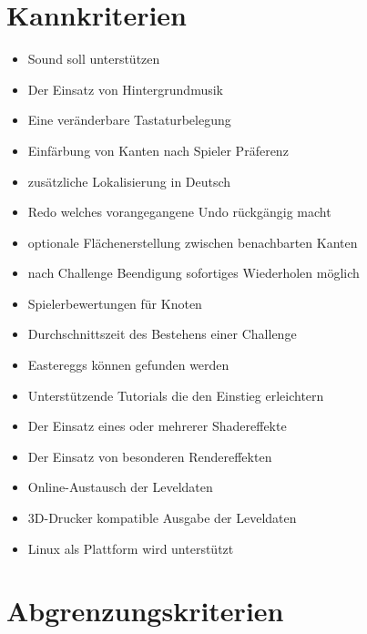 \section{Kannkriterien}


\begin{itemize}
\item Sound soll unterstützen

\item Der Einsatz von Hintergrundmusik

\item Eine veränderbare Tastaturbelegung

\item Einfärbung von Kanten nach Spieler Präferenz

\item zusätzliche Lokalisierung in Deutsch

\item Redo welches vorangegangene Undo rückgängig macht

\item optionale Flächenerstellung zwischen benachbarten Kanten

\item nach Challenge Beendigung sofortiges Wiederholen möglich

\item Spielerbewertungen für Knoten

\item Durchschnittszeit des Bestehens einer Challenge

\item Eastereggs können gefunden werden

\item Unterstützende Tutorials die den Einstieg erleichtern
	
\item Der Einsatz eines oder mehrerer Shadereffekte

\item Der Einsatz von besonderen Rendereffekten 

\item Online-Austausch der Leveldaten

\item 3D-Drucker kompatible Ausgabe der Leveldaten

\item Linux als Plattform wird unterstützt
\end{itemize}

\section{Abgrenzungskriterien}


